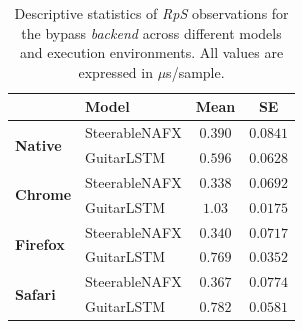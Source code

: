 \begin{table}[htbp]
\caption{Descriptive statistics of \emph{RpS} observations for the bypass \emph{backend} across different models and execution environments. All values are expressed in $\mu$s/sample.}
\label{tab:runtime-overview}
\centering
\setlength{\tabcolsep}{3pt}
\begin{tabular}{llcc}
\toprule
& \textbf{Model} & \textbf{Mean} & \textbf{SE} \\
\midrule
  \multirow{2}{*}{\textbf{Native}} & SteerableNAFX & $0.390$ & $0.0841$ \\
   & GuitarLSTM & $0.596$ & $0.0628$ \\
\midrule
  \multirow{2}{*}{\textbf{Chrome}} & SteerableNAFX & $0.338$ & $0.0692$ \\
   & GuitarLSTM & $1.03$ & $0.0175$ \\
\midrule
  \multirow{2}{*}{\textbf{Firefox}} & SteerableNAFX & $0.340$ & $0.0717$ \\
   & GuitarLSTM & $0.769$ & $0.0352$ \\
\midrule
  \multirow{2}{*}{\textbf{Safari}} & SteerableNAFX & $0.367$ & $0.0774$ \\
   & GuitarLSTM & $0.782$ & $0.0581$ \\
\bottomrule
\end{tabular}
\end{table}
